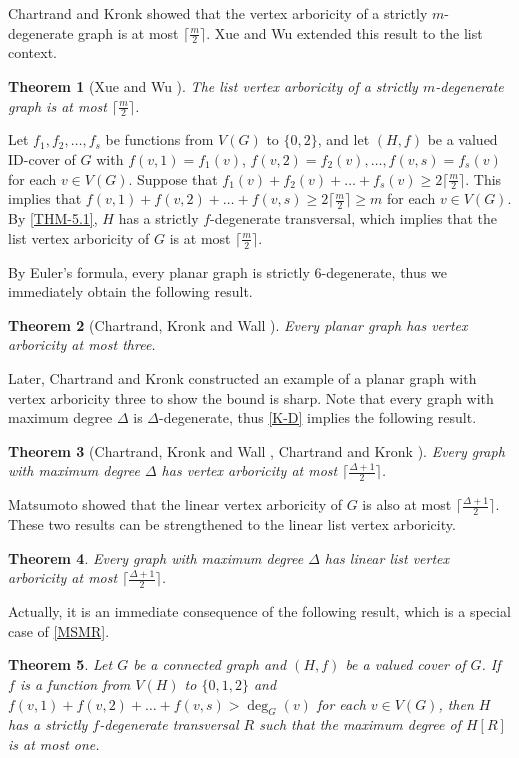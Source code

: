 \documentclass{article}
\makeatletter
\renewenvironment{proof}[1][\proofname]{\par
  \pushQED{\qed}%
  \normalfont \topsep6\p@\@plus6\p@\relax
  \trivlist
  \item[\hskip\labelsep
        \bfseries
    #1\@addpunct{.}]\ignorespaces
}{%
  \popQED\endtrivlist\@endpefalse
}
\newtheorem{theorem}{Theorem}[section]
\theoremstyle{definition}
\makeatother
\begin{document}
Chartrand and Kronk \cite{MR0239996} showed that the vertex arboricity of a strictly $m$-degenerate graph is at most $\lceil\frac{m}{2}\rceil$. Xue and Wu \cite{MR2947381} extended this result to the list context. 
\begin{theorem}[Xue and Wu \cite{MR2947381}]\label{K-D}
The list vertex arboricity of a strictly $m$-degenerate graph is at most $\lceil\frac{m}{2}\rceil$. 
\end{theorem}
\begin{proof}
Let $f_{1}, f_{2}, \dots, f_{s}$ be functions from $V(G)$ to $\{0, 2\}$, and let $(H, f)$ be a valued ID-cover of $G$ with $f(v, 1) = f_{1}(v)$, $f(v, 2) = f_{2}(v), \dots, f(v, s) = f_{s}(v)$ for each $v \in V(G)$. Suppose that $f_{1}(v) + f_{2}(v) + \dots + f_{s}(v) \geq 2\lceil\frac{m}{2}\rceil$. This implies that $f(v, 1) + f(v, 2) + \dots + f(v, s) \geq 2\lceil\frac{m}{2}\rceil \geq m$ for each $v \in V(G)$. By \autoref{THM-5.1}, $H$ has a strictly $f$-degenerate transversal, which implies that the list vertex arboricity of $G$ is at most $\lceil\frac{m}{2}\rceil$. 
\end{proof}


By Euler's formula, every planar graph is strictly $6$-degenerate, thus we immediately obtain the following result. 
\begin{theorem}[Chartrand, Kronk and Wall \cite{MR0236049}]
Every planar graph has vertex arboricity at most three. 
\end{theorem}

Later, Chartrand and Kronk \cite{MR0239996} constructed an example of a planar graph with vertex arboricity three to show the bound is sharp. Note that every graph with maximum degree $\Delta$ is $\Delta$-degenerate, thus \autoref{K-D} implies the following result.

\begin{theorem}[Chartrand, Kronk and Wall \cite{MR0236049}, Chartrand and Kronk \cite{MR0239996}]
Every graph with maximum degree $\Delta$ has vertex arboricity at most $\lceil\frac{\Delta + 1}{2}\rceil$.
\end{theorem}

Matsumoto \cite{MR1037427} showed that the linear vertex arboricity of $G$ is also at most $\lceil\frac{\Delta + 1}{2}\rceil$. These two results can be strengthened to the linear list vertex arboricity. 
\begin{theorem}
Every graph with maximum degree $\Delta$ has linear list vertex arboricity at most $\lceil\frac{\Delta + 1}{2}\rceil$.
\end{theorem}
Actually, it is an immediate consequence of the following result, which is a special case of \autoref{MSMR}. 
\begin{theorem}
Let $G$ be a connected graph and $(H, f)$ be a valued cover of $G$. If $f$ is a function from $V(H)$ to $\{0, 1, 2\}$ and $f(v, 1) + f(v, 2) + \dots + f(v, s) > \deg_{G}(v)$ for each $v \in V(G)$, then $H$ has a strictly $f$-degenerate transversal $R$ such that the maximum degree of $H[R]$ is at most one. 
\end{theorem}
\end{document}
